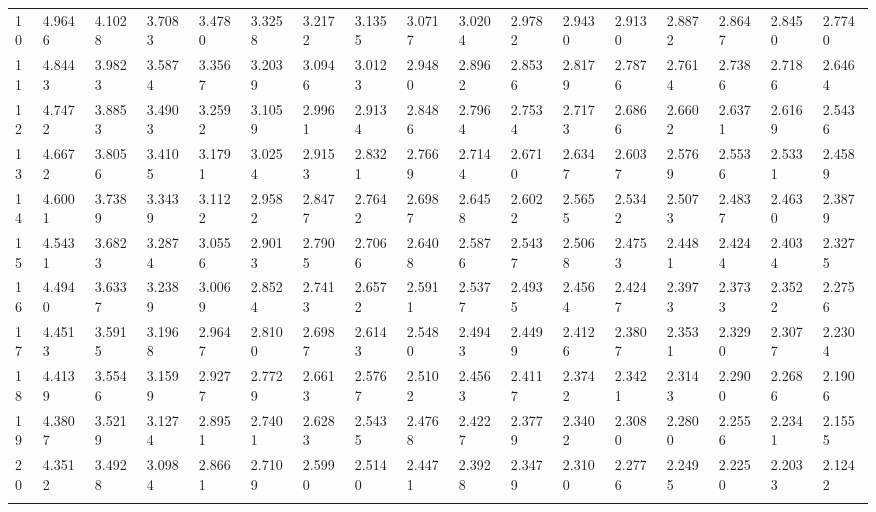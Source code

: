 {\begin{tabular}{|m{8pt}|m{18pt}*{15}{m{18pt}}}
 10 & 4.9646 & 4.1028 & 3.7083 & 3.4780 & 3.3258 & 3.2172 & 3.1355 & 3.0717 & 3.0204 & 2.9782 & 2.9430 & 2.9130 & 2.8872 & 2.8647 & 2.8450 & 2.7740 \\[2pt] \arrayrulecolor{light-gray}\hline\arrayrulecolor{black}  
 11 & 4.8443 & 3.9823 & 3.5874 & 3.3567 & 3.2039 & 3.0946 & 3.0123 & 2.9480 & 2.8962 & 2.8536 & 2.8179 & 2.7876 & 2.7614 & 2.7386 & 2.7186 & 2.6464 \\[2pt] \arrayrulecolor{light-gray}\hline\arrayrulecolor{black}  
 12 & 4.7472 & 3.8853 & 3.4903 & 3.2592 & 3.1059 & 2.9961 & 2.9134 & 2.8486 & 2.7964 & 2.7534 & 2.7173 & 2.6866 & 2.6602 & 2.6371 & 2.6169 & 2.5436 \\[2pt] \arrayrulecolor{light-gray}\hline\arrayrulecolor{black}  
 13 & 4.6672 & 3.8056 & 3.4105 & 3.1791 & 3.0254 & 2.9153 & 2.8321 & 2.7669 & 2.7144 & 2.6710 & 2.6347 & 2.6037 & 2.5769 & 2.5536 & 2.5331 & 2.4589 \\[2pt] \arrayrulecolor{light-gray}\hline\arrayrulecolor{black}  
 14 & 4.6001 & 3.7389 & 3.3439 & 3.1122 & 2.9582 & 2.8477 & 2.7642 & 2.6987 & 2.6458 & 2.6022 & 2.5655 & 2.5342 & 2.5073 & 2.4837 & 2.4630 & 2.3879 \\[2pt] \arrayrulecolor{light-gray}\hline\arrayrulecolor{black}  
 15 & 4.5431 & 3.6823 & 3.2874 & 3.0556 & 2.9013 & 2.7905 & 2.7066 & 2.6408 & 2.5876 & 2.5437 & 2.5068 & 2.4753 & 2.4481 & 2.4244 & 2.4034 & 2.3275 \\[2pt] \arrayrulecolor{light-gray}\hline\arrayrulecolor{black}  
 16 & 4.4940 & 3.6337 & 3.2389 & 3.0069 & 2.8524 & 2.7413 & 2.6572 & 2.5911 & 2.5377 & 2.4935 & 2.4564 & 2.4247 & 2.3973 & 2.3733 & 2.3522 & 2.2756 \\[2pt] \arrayrulecolor{light-gray}\hline\arrayrulecolor{black}  
 17 & 4.4513 & 3.5915 & 3.1968 & 2.9647 & 2.8100 & 2.6987 & 2.6143 & 2.5480 & 2.4943 & 2.4499 & 2.4126 & 2.3807 & 2.3531 & 2.3290 & 2.3077 & 2.2304 \\[2pt] \arrayrulecolor{light-gray}\hline\arrayrulecolor{black}  
 18 & 4.4139 & 3.5546 & 3.1599 & 2.9277 & 2.7729 & 2.6613 & 2.5767 & 2.5102 & 2.4563 & 2.4117 & 2.3742 & 2.3421 & 2.3143 & 2.2900 & 2.2686 & 2.1906 \\[2pt] \arrayrulecolor{light-gray}\hline\arrayrulecolor{black}  
 19 & 4.3807 & 3.5219 & 3.1274 & 2.8951 & 2.7401 & 2.6283 & 2.5435 & 2.4768 & 2.4227 & 2.3779 & 2.3402 & 2.3080 & 2.2800 & 2.2556 & 2.2341 & 2.1555 \\[2pt] \arrayrulecolor{light-gray}\hline\arrayrulecolor{black}  
 20 & 4.3512 & 3.4928 & 3.0984 & 2.8661 & 2.7109 & 2.5990 & 2.5140 & 2.4471 & 2.3928 & 2.3479 & 2.3100 & 2.2776 & 2.2495 & 2.2250 & 2.2033 & 2.1242 \\[2pt] \arrayrulecolor{light-gray}\hline\arrayrulecolor{black}  

\end{tabular}}
